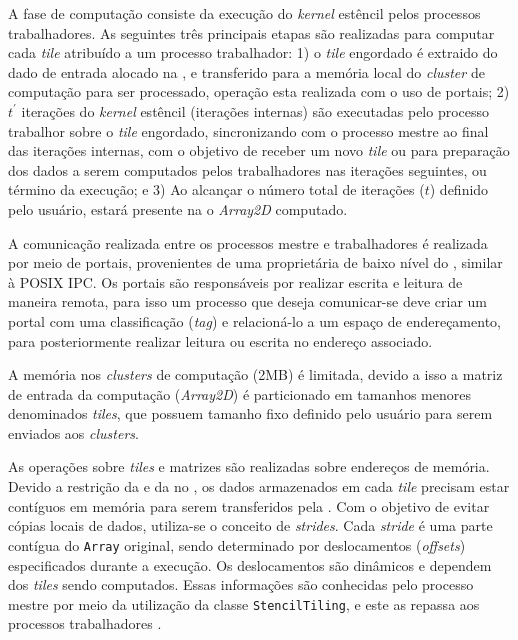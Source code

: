 A fase de computação consiste da execução do \emph{kernel} estêncil pelos processos trabalhadores. As seguintes três principais etapas são realizadas para computar cada \emph{tile} atribuído a um processo trabalhador: 1) o \emph{tile} engordado é extraido do dado de entrada alocado na \lpddr, e transferido para a memória local do \emph{cluster} de computação para ser processado, operação esta realizada com o uso de portais; 2) $t^\prime$ iterações do \emph{kernel} estêncil (iterações internas) são executadas pelo processo trabalhor sobre o \emph{tile} engordado, sincronizando com o processo mestre ao final das iterações internas, com o objetivo de receber um novo \textit{tile} ou para preparação dos dados a serem computados pelos trabalhadores nas iterações seguintes, ou término da execução; e 3) Ao alcançar o número total de iterações ($t$) definido pelo usuário, estará presente na \lpddr o \textit{Array2D} computado.

A comunicação realizada entre os processos mestre e trabalhadores é realizada por meio de portais, provenientes de uma \api proprietária de baixo nível do \mppa, similar à POSIX IPC. Os portais são responsáveis por realizar escrita e leitura de maneira remota, para isso um processo que deseja comunicar-se deve criar um portal com uma classificação (\textit{tag}) e relacioná-lo a um espaço de endereçamento, para posteriormente realizar leitura ou escrita no endereço associado.

A memória nos \textit{clusters} de computação (2MB) é limitada, devido a isso a matriz de entrada da computação (\textit{Array2D}) é particionado em tamanhos menores denominados \textit{tiles}, que possuem tamanho fixo definido pelo usuário para serem enviados aos \textit{clusters}.

As operações sobre \textit{tiles} e matrizes são realizadas sobre endereços de memória. Devido a restrição da \api e da \noc no \mppa, os dados armazenados em cada \textit{tile} precisam estar contíguos em memória para serem transferidos
pela \noc. Com o objetivo de evitar cópias locais de dados, utiliza-se o conceito de \textit{strides}. Cada \textit{stride} é uma parte contígua do \texttt{Array} original, sendo determinado por deslocamentos (\textit{offsets}) especificados durante a
execução. Os deslocamentos são dinâmicos e dependem dos \textit{tiles} sendo computados. Essas informações são conhecidas pelo processo mestre por meio da utilização da classe \texttt{StencilTiling}, e este as repassa aos processos trabalhadores \cite{Podesta:TCC}.


